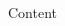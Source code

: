 \documentclass[11pt]{article}
\begin{document}
\begin{multicols}{2} %

Content



\end{multicols} %
\end{document}
